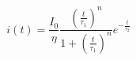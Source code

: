 \begin{equation}
i(t) = \frac{I_0}{\eta} \frac{{\left (\frac{t}{\tau_1} \right )}^n}{1 + {\left (\frac{t}{\tau_1} \right )}^n} e^{-\frac{t}{\tau_2}} 
\label{eqn:HF}
\end{equation}